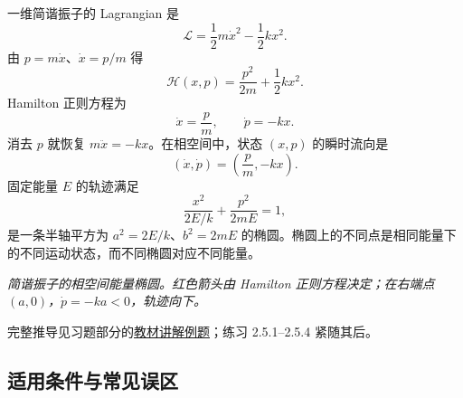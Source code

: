 
一维简谐振子的 Lagrangian 是
\begin{equation}
  \mathcal L=\frac12m\dot x^2-\frac12kx^2.
  \label{eq:QM-C02-S05-oscillator-lagrangian}
\end{equation}
由 $p=m\dot x$、$\dot x=p/m$ 得
\begin{equation}
  \boxed{
  \mathcal H(x,p)=\frac{p^2}{2m}+\frac12kx^2.}
  \label{eq:QM-C02-S05-oscillator-hamiltonian}
\end{equation}
Hamilton 正则方程为
\begin{equation}
  \dot x=\frac pm,
  \qquad
  \dot p=-kx.
  \label{eq:QM-C02-S05-oscillator-hamilton-equations}
\end{equation}
消去 $p$ 就恢复 $m\ddot x=-kx$。在相空间中，状态 $(x,p)$ 的瞬时流向是
\[
  (\dot x,\dot p)=\left(\frac pm,-kx\right).
\]
固定能量 $E$ 的轨迹满足
\begin{equation}
  \boxed{
  \frac{x^2}{2E/k}+\frac{p^2}{2mE}=1,}
  \label{eq:QM-C02-S05-oscillator-ellipse}
\end{equation}
是一条半轴平方为 $a^2=2E/k$、$b^2=2mE$ 的椭圆。椭圆上的不同点是相同能量下的不同运动状态，而不同椭圆对应不同能量。

\begin{center}

\textit{简谐振子的相空间能量椭圆。红色箭头由 Hamilton 正则方程决定；在右端点 $(a,0)$，$\dot p=-ka<0$，轨迹向下。}
\end{center}

完整推导见习题部分的\hyperref[exercise:QM-C02-S05-E00]{教材讲解例题}；练习 2.5.1--2.5.4 紧随其后。

\subsection{适用条件与常见误区}

